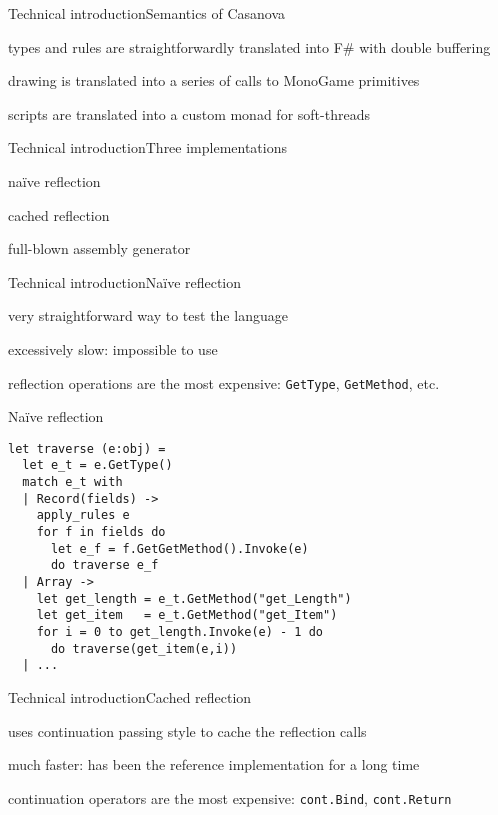 \documentclass{beamer}
\begin{document}
\begin{slide}{Technical introduction}{Semantics of Casanova}{
\item types and rules are straightforwardly translated into F\# with double buffering
\item drawing is translated into a series of calls to MonoGame primitives
\item scripts are translated into a custom monad for soft-threads
}\end{slide}


\begin{slide}{Technical introduction}{Three implementations}{
\item naïve reflection
\item cached reflection
\item full-blown assembly generator
}\end{slide}


\begin{slide}{Technical introduction}{Naïve reflection}{
\item very straightforward way to test the language
\item excessively slow: impossible to use
\item reflection operations are the most expensive: \texttt{GetType}, \texttt{GetMethod}, etc.
}\end{slide}


\begin{frame}[fragile]{Naïve reflection}
\begin{lstlisting}
let traverse (e:obj) =
  let e_t = e.GetType()
  match e_t with
  | Record(fields) ->
    apply_rules e
    for f in fields do
      let e_f = f.GetGetMethod().Invoke(e)
      do traverse e_f
  | Array ->
    let get_length = e_t.GetMethod("get_Length")
    let get_item   = e_t.GetMethod("get_Item")
    for i = 0 to get_length.Invoke(e) - 1 do
      do traverse(get_item(e,i))
  | ...
\end{lstlisting}
\end{frame}

\begin{slide}{Technical introduction}{Cached reflection}{
\item uses continuation passing style to cache the reflection calls
\item much faster: has been the reference implementation for a long time
\item continuation operators are the most expensive: \texttt{cont.Bind}, \texttt{cont.Return}
}\end{slide}
\end{document}
